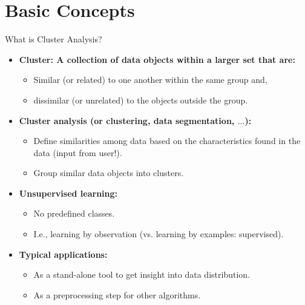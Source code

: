 \section{Basic Concepts}

\begin{frame}{What is Cluster Analysis?}
	\begin{itemize}
		\item \textbf{{\color{airforceblue}Cluster}: A collection of data
			      objects within a larger set that are:}
		      \begin{itemize}
			      \item {\color{airforceblue}Similar (or related)} to one another
			            within the same group and,
			      \item dissimilar (or unrelated) to the objects outside the group.
		      \end{itemize}
		\item \textbf{{\color{airforceblue}Cluster analysis} (or clustering,
			      data segmentation, $\ldots$):}
		      \begin{itemize}
			      \item {\color{airforceblue}Define similarities} among data based on
			            the characteristics found in the data (input from user!).
			      \item Group similar data objects into clusters.
		      \end{itemize}
		\item \textbf{Unsupervised learning:}
		      \begin{itemize}
			      \item No predefined classes.
			      \item I.e., learning by observation (vs. learning by examples:
			            supervised).
		      \end{itemize}
		\item \textbf{Typical applications:}
		      \begin{itemize}
			      \item As a stand-alone tool to get insight into data distribution.
			      \item As a preprocessing step for other algorithms.
		      \end{itemize}
	\end{itemize}
\end{frame}

